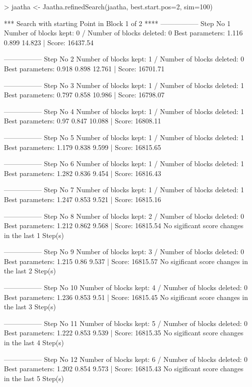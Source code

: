 
\begin{Schunk}
\begin{Sinput}
> jaatha <- Jaatha.refinedSearch(jaatha, best.start.pos=2, sim=100)
\end{Sinput}
\begin{Soutput}
*** Search with starting Point in Block 1 of 2 **** 
----------------- 
Step No 1 
Number of blocks kept: 0  / Number of blocks deleted: 0 
Best parameters:  1.116 0.899 14.823 | Score: 16437.54 

----------------- 
Step No 2 
Number of blocks kept: 1  / Number of blocks deleted: 0 
Best parameters:  0.918 0.898 12.761 | Score: 16701.71 

----------------- 
Step No 3 
Number of blocks kept: 1  / Number of blocks deleted: 1 
Best parameters:  0.797 0.858 10.986 | Score: 16798.07 

----------------- 
Step No 4 
Number of blocks kept: 1  / Number of blocks deleted: 1 
Best parameters:  0.97 0.847 10.088 | Score: 16808.11 

----------------- 
Step No 5 
Number of blocks kept: 1  / Number of blocks deleted: 1 
Best parameters:  1.179 0.838 9.599 | Score: 16815.65 

----------------- 
Step No 6 
Number of blocks kept: 1  / Number of blocks deleted: 1 
Best parameters:  1.282 0.836 9.454 | Score: 16816.43 

----------------- 
Step No 7 
Number of blocks kept: 1  / Number of blocks deleted: 1 
Best parameters:  1.247 0.853 9.521 | Score: 16815.16 

----------------- 
Step No 8 
Number of blocks kept: 2  / Number of blocks deleted: 0 
Best parameters:  1.212 0.862 9.568 | Score: 16815.54 
No sigificant score changes in the last 1 Step(s) 

----------------- 
Step No 9 
Number of blocks kept: 3  / Number of blocks deleted: 0 
Best parameters:  1.215 0.86 9.537 | Score: 16815.57 
No sigificant score changes in the last 2 Step(s) 

----------------- 
Step No 10 
Number of blocks kept: 4  / Number of blocks deleted: 0 
Best parameters:  1.236 0.853 9.51 | Score: 16815.45 
No sigificant score changes in the last 3 Step(s) 

----------------- 
Step No 11 
Number of blocks kept: 5  / Number of blocks deleted: 0 
Best parameters:  1.222 0.853 9.539 | Score: 16815.35 
No sigificant score changes in the last 4 Step(s) 

----------------- 
Step No 12 
Number of blocks kept: 6  / Number of blocks deleted: 0 
Best parameters:  1.202 0.854 9.573 | Score: 16815.43 
No sigificant score changes in the last 5 Step(s) 


\end{Soutput}
\end{Schunk}
